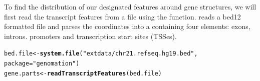 \documentclass{article}\usepackage[]{graphicx}\usepackage[]{color}
\makeatletter
\newcommand{\hlstr}[1]{\textcolor[rgb]{0.192,0.494,0.8}{#1}}%
\newcommand{\hlstd}[1]{\textcolor[rgb]{0.345,0.345,0.345}{#1}}%
\newcommand{\hlkwb}[1]{\textcolor[rgb]{0.69,0.353,0.396}{#1}}%
\newcommand{\hlkwc}[1]{\textcolor[rgb]{0.333,0.667,0.333}{#1}}%
\newcommand{\hlkwd}[1]{\textcolor[rgb]{0.737,0.353,0.396}{\textbf{#1}}}%
\newenvironment{kframe}{%
 \def\at@end@of@kframe{}%
 \ifinner\ifhmode%
  \def\at@end@of@kframe{\end{minipage}}%
  \begin{minipage}{\columnwidth}%
 \fi\fi%
 \def\FrameCommand##1{\hskip\@totalleftmargin \hskip-\fboxsep
 \colorbox{shadecolor}{##1}\hskip-\fboxsep
     \hskip-\linewidth \hskip-\@totalleftmargin \hskip\columnwidth}%
 \MakeFramed {\advance\hsize-\width
   \@totalleftmargin\z@ \linewidth\hsize
   \@setminipage}}%
 {\par\unskip\endMakeFramed%
 \at@end@of@kframe}
\newenvironment{knitrout}{}{} %
\makeatother
\begin{document}
To find the distribution of our designated features around gene structures, 
we will first read the transcript features from a file using the 
 function.  reads
a bed12 formatted file and parses the coordinates into a  containing
four elements: exons, introns. promoters and transcription start sites (TSSes).
\begin{knitrout}
\color{fgcolor}\begin{kframe}
\begin{alltt}
\hlstd{bed.file} \hlkwb{<-} \hlkwd{system.file}\hlstd{(}\hlstr{"extdata/chr21.refseq.hg19.bed"}\hlstd{,}
    \hlkwc{package} \hlstd{=} \hlstr{"genomation"}\hlstd{)}
\hlstd{gene.parts} \hlkwb{<-} \hlkwd{readTranscriptFeatures}\hlstd{(bed.file)}
\end{alltt}


{\ttfamily\noindent\itshape\color{messagecolor}{\#\# Reading the table...
\\\#\# Calculating intron coordinates...
\\\#\# Calculating exon coordinates...
\\\#\# Calculating TSS coordinates...
\\\#\# Calculating promoter coordinates...
\\\#\# Outputting the final GRangesList...
}}\end{kframe}
\end{knitrout}
\end{document}
